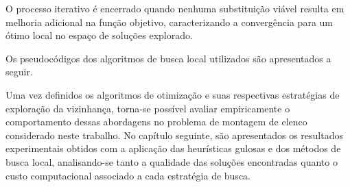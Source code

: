O processo iterativo é encerrado quando nenhuma substituição viável resulta em melhoria adicional na função objetivo, caracterizando a 
convergência para um ótimo local no espaço de soluções explorado.

Os pseudocódigos dos algoritmos de busca local utilizados são apresentados a seguir.



\FloatBarrier

Uma vez definidos os algoritmos de otimização e suas respectivas estratégias de exploração da vizinhança, torna-se possível avaliar empiricamente 
o comportamento dessas abordagens no problema de montagem de elenco considerado neste trabalho. No capítulo seguinte, são apresentados os resultados experimentais 
obtidos com a aplicação das heurísticas gulosas e dos métodos de busca local, analisando-se tanto a qualidade das soluções encontradas quanto o custo computacional 
associado a cada estratégia de busca.